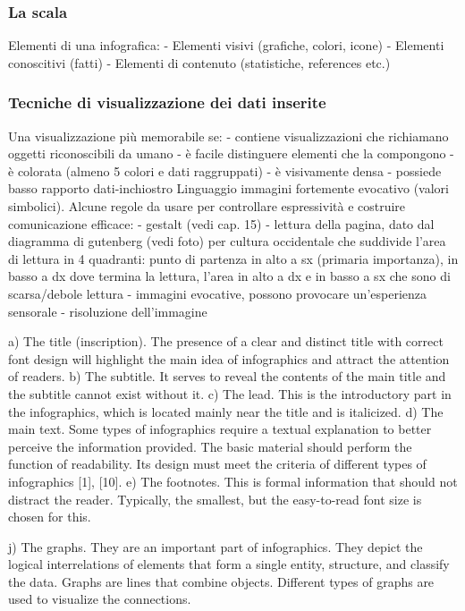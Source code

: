 \subsubsection{La scala}
Elementi di una infografica:
-	Elementi visivi (grafiche, colori, icone)
-	Elementi conoscitivi (fatti)
-	Elementi di contenuto (statistiche, references etc.)


\subsubsection{Tecniche di visualizzazione dei dati inserite}
Una visualizzazione più memorabile se:
-	contiene visualizzazioni che richiamano oggetti riconoscibili da umano
-	è facile distinguere elementi che la compongono
-	è colorata (almeno 5 colori e dati raggruppati)
-	è visivamente densa
-	possiede basso rapporto dati-inchiostro
Linguaggio immagini fortemente evocativo (valori simbolici). Alcune regole da usare per controllare espressività e costruire comunicazione efficace:
-	gestalt (vedi cap. 15)
-	lettura della pagina, dato dal diagramma di gutenberg (vedi foto) per cultura occidentale che suddivide l'area di lettura in 4 quadranti: punto di partenza in alto a sx (primaria importanza), in basso a dx dove termina la lettura, l'area in alto a dx e in basso a sx che sono di scarsa/debole lettura
-	immagini evocative, possono provocare un'esperienza sensorale
-	risoluzione dell'immagine

a) The title (inscription). The presence of a clear and
distinct title with correct font design will highlight the
main idea of infographics and attract the attention of
readers.
b) The subtitle. It serves to reveal the contents of
the main title and the subtitle cannot exist without it.
c) The lead. This is the introductory part in the
infographics, which is located mainly near the title and is
italicized.
d) The main text. Some types of infographics require
a textual explanation to better perceive the information
provided. The basic material should perform the function
of readability. Its design must meet the criteria of different
types of infographics [1], [10].
e) The footnotes. This is formal information that
should not distract the reader. Typically, the smallest, but
the easy-to-read font size is chosen for this.


j) The graphs. They are an important part of
infographics. They depict the logical interrelations of
elements that form a single entity, structure, and classify
the data. Graphs are lines that combine objects. Different
types of graphs are used to visualize the connections.


